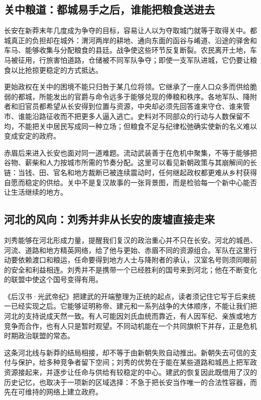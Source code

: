 \subsection{关中粮道：都城易手之后，谁能把粮食送进去}

长安在新莽末年几度成为争夺的目标，容易让人以为夺取城门就等于取得关中。都城真正的负担却在城外：渭河两岸的耕地、通向东面的函谷与崤道、沿途的驿舍和车马、能够收集与分配粮食的县廷。战争使这些环节反复断裂。农民离开土地，车马被征用，行旅害怕道路，仓储被不同军队争夺；即使一支军队进城，它仍要让粮食以比抢掠更稳定的方式抵达。

更始政权在关中的困境不能只归咎于某几位将领。它继承了一座人口众多而供给脆弱的都城，所能发出的官爵与命令远多于能够兑现的俸粮和秩序。各地军队、降附者和旧官员都希望从长安得到位置与资源，中央却必须先回答谁来守仓、谁来管市、谁能沿路征收而不把更多人逼入逃亡。史料对不同部众的行动与人数保留不均，不能把关中居民写成同一种立场；但粮食不足与纪律松弛确实使新的名义难以变成安定的政府。

赤眉后来进入长安也面对同一道难题。流动武装善于在危机中聚集，不等于能够把谷物、薪柴和人力按城市所需的节奏分配。这里可以看见新朝政策与其崩解间的长链：当钱、田、官名和地方裁断已被连续震动时，任何继起政权都更难从乡村获得自愿而稳定的供给。关中不是复汉故事的一张背景图，而是检验每一个新中心能否让生活继续的地方。

\subsection{河北的风向：刘秀并非从长安的废墟直接走来}

刘秀能够在河北形成力量，提醒我们复汉的政治重心并不只在长安。河北的城邑、河流、道路和地方精英网络，给了他与更始、赤眉不同的资源组合。军队在这里行动要依赖渡口和粮运，任命要得到地方人士与降附者的承认，汉室名号则须同眼前的安全和利益相连。刘秀并不是携带一个已经胜利的国号来到河北；他在不断变化的联盟中使这个国号变得有用。

《后汉书·光武帝纪》把建武的开端整理为正统的起点，读者须记住它写于后来统一已经实现之后。它能够证明称帝、建元和一系列战争的大体顺序，不能让我们把河北的支持说成天然一致。有人可能因刘氏血统而靠近，有人因军纪、亲族或地方竞争而合作，也有人只是暂时观望。不同动机能在一个共同旗帜下并存，正是危机时期政治联盟的常态。

这条河北线与新莽的结局相接，却不等于由新朝失败自动推出。新朝失去可信的支付与保护，给多种竞争者留下空间；刘秀的优势在于能在某些道路和城邑上把军政资源接起来，并逐步让任命与供给有较稳定的中心。建武的恢复因此既借用了汉的历史记忆，也取决于一项新的区域选择：不急于把长安当作唯一的合法性容器，而先在可维持的网络上建立政府。

